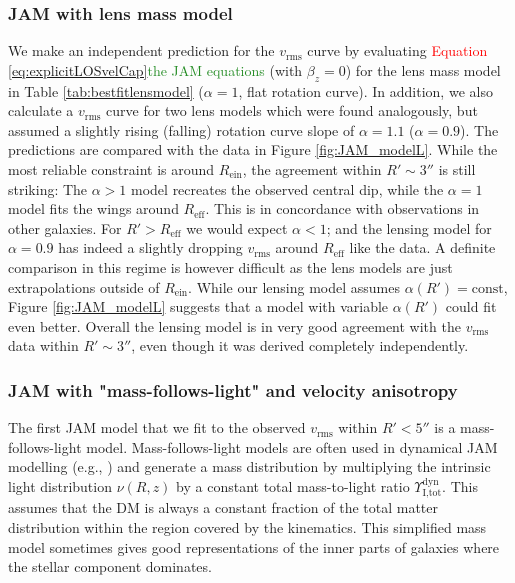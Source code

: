 \documentclass[useAMS,usenatbib]{mnras}
\newcommand{\NEW}[1]{\textcolor{ForestGreen}{#1}}
\newcommand{\OLD}[1]{\textcolor{Red}{#1}}
\begin{document}
\subsubsection{JAM with lens mass model}

We make an independent prediction for the $v_\text{rms}$ curve by evaluating \OLD{Equation \eqref{eq:explicitLOSvelCap}}\NEW{the JAM equations} (with $\beta_z = 0$) for the lens mass model in Table \ref{tab:bestfitlensmodel} ($\alpha = 1$, flat rotation curve). In addition, we also calculate a  $v_\text{rms}$ curve for two lens models which were found analogously, but assumed a slightly rising (falling) rotation curve slope of $\alpha=1.1$ ($\alpha=0.9$). The predictions are compared with the data in Figure \ref{fig:JAM_modelL}. While the most reliable constraint is around $R_\text{ein}$, the agreement within $R' \sim 3''$ is still striking: The $\alpha > 1$ model recreates the observed central dip, while the $\alpha = 1$ model fits the wings around $R_\text{eff}$. This is in concordance with observations in other galaxies. For $R'> R_\text{eff}$ we would expect $\alpha<1$; and the lensing model for $\alpha=0.9$ has indeed a slightly dropping $v_\text{rms}$ around $R_\text{eff}$ like the data. A definite comparison in this regime is however difficult as the lens models are just extrapolations outside of $R_\text{ein}$. While our lensing model assumes $\alpha(R')=\text{const}$, Figure \ref{fig:JAM_modelL} suggests that a model with variable $\alpha(R')$ could fit even better. Overall the lensing model is in very good agreement with the $v_\text{rms}$ data within $R' \sim 3''$, even though it was derived completely independently.

\subsubsection{JAM with "mass-follows-light" and velocity anisotropy} \label{sec:results_JAM_SB_MfL}

The first JAM model that we fit to the observed $v_\text{rms}$ within $R'<5''$ is a mass-follows-light model. Mass-follows-light models are often used in dynamical JAM modelling (e.g., \citealt{GlennEC,Cap06}) and generate a mass distribution by multiplying the intrinsic light distribution $\nu(R,z)$ by a constant total mass-to-light ratio  $\Upsilon_\text{I,tot}^\text{dyn}$. This assumes that the DM is always a constant fraction of the total matter distribution within the region covered by the kinematics. This simplified mass model sometimes gives good representations of the inner parts of galaxies where the stellar component dominates.
\end{document}
